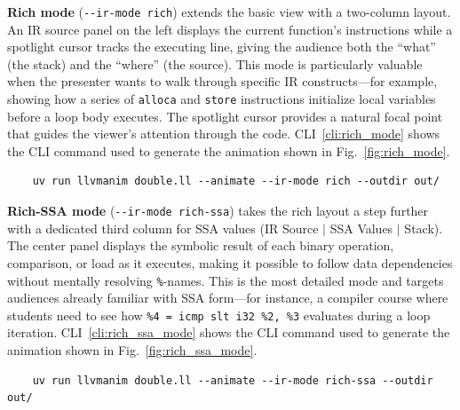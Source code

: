 \textbf{Rich mode} (\texttt{-{}-ir-mode rich}) extends the basic view with a two-column layout. An IR source panel on the left displays the current function's instructions while a spotlight cursor tracks the executing line, giving the audience both the ``what'' (the stack) and the ``where'' (the source). This mode is particularly valuable when the presenter wants to walk through specific IR constructs---for example, showing how a series of \texttt{alloca} and \texttt{store} instructions initialize local variables before a loop body executes. The spotlight cursor provides a natural focal point that guides the viewer's attention through the code. CLI~\ref{cli:rich_mode} shows the CLI command used to generate the animation shown in Fig.~\ref{fig:rich_mode}.
\vspace{-2ex}
\begin{clilisting}[h]
  \begin{verbatim}
    uv run llvmanim double.ll --animate --ir-mode rich --outdir out/
  \end{verbatim}
  \vspace{-5ex}
  \caption{Command to generate a rich mode animation shown in Fig.~\ref{fig:rich_mode}.}
  \label{cli:rich_mode}
\end{clilisting}

\textbf{Rich-SSA mode} (\texttt{-{}-ir-mode rich-ssa}) takes the rich layout a step further with a dedicated third column for SSA values (IR Source $\mid$ SSA Values $\mid$ Stack). The center panel displays the symbolic result of each binary operation, comparison, or load as it executes, making it possible to follow data dependencies without mentally resolving \texttt{\%}-names. This is the most detailed mode and targets audiences already familiar with SSA form---for instance, a compiler course where students need to see how \texttt{\%4 = icmp slt i32 \%2, \%3} evaluates during a loop iteration. CLI~\ref{cli:rich_ssa_mode} shows the CLI command used to generate the animation shown in Fig.~\ref{fig:rich_ssa_mode}.
\vspace{-2ex}
\begin{clilisting}[H]
  \begin{verbatim}
    uv run llvmanim double.ll --animate --ir-mode rich-ssa --outdir out/
  \end{verbatim}
  \vspace{-5ex}
  \caption{Command to generate a rich-SSA mode animation shown in Fig.~\ref{fig:rich_ssa_mode}.}
  \label{cli:rich_ssa_mode}
\end{clilisting}

